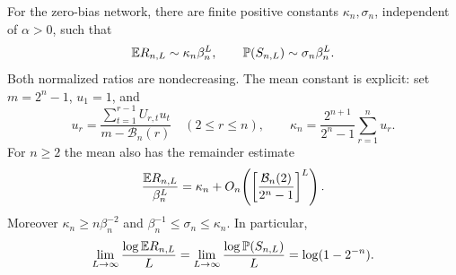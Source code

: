 \begin{corollary}\label{cor:fixed-width-depth}
For the zero-bias network, there are finite positive constants $\kappa_n,\sigma_n$, independent of $\alpha>0$, such that
\begin{equation}\label{eq:depth-ratios}
\mathbb{E} R_{n,L}\sim\kappa_n\beta_n^L,\qquad
\mathbb{P}(S_{n,L})\sim\sigma_n\beta_n^L.
\end{equation}
Both normalized ratios are nondecreasing. The mean constant is explicit: set $m=2^n-1$, $u_1=1$, and
\begin{equation}\label{eq:depth-constant}
u_r=\frac{\sum_{t=1}^{r-1}U_{r,t}u_t}{m-\mathcal B_n(r)}
\quad(2\le r\le n),\qquad
\kappa_n=\frac{2^{n+1}}{2^n-1}\sum_{r=1}^nu_r.
\end{equation}
For $n\ge2$ the mean also has the remainder estimate
\[
\frac{\mathbb{E} R_{n,L}}{\beta_n^L}
=\kappa_n+O_n\!\left(\left[\frac{\mathcal B_n(2)}{2^n-1}\right]^L\right).
\]
Moreover $\kappa_n\ge n\beta_n^{-2}$ and $\beta_n^{-1}\le\sigma_n\le\kappa_n$. In particular,
\begin{equation}\label{eq:depth-rate}
\lim_{L\to\infty}\frac{\log\mathbb{E} R_{n,L}}L
=\lim_{L\to\infty}\frac{\log\mathbb{P}(S_{n,L})}L
=\log(1-2^{-n}).
\end{equation}
\end{corollary}

